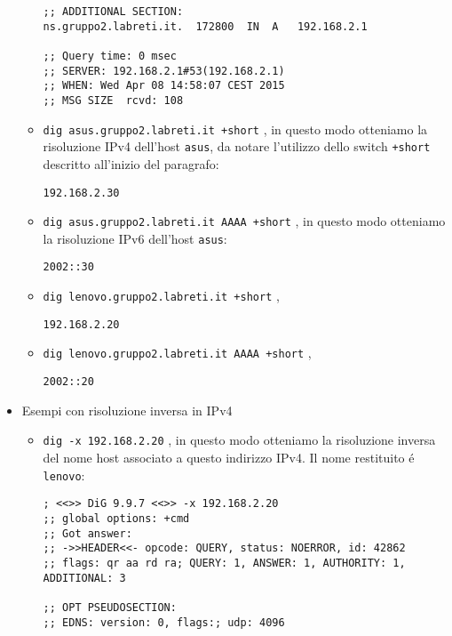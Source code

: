 \documentclass[9pt, a4paper, oneside]{article}
\begin{document}
\begin{itemize}
\begin{itemize}
\begin{verbatim}
;; ADDITIONAL SECTION:
ns.gruppo2.labreti.it.	172800	IN	A	192.168.2.1

;; Query time: 0 msec
;; SERVER: 192.168.2.1#53(192.168.2.1)
;; WHEN: Wed Apr 08 14:58:07 CEST 2015
;; MSG SIZE  rcvd: 108
								\end{verbatim}
							\item
								\texttt{dig asus.gruppo2.labreti.it +short} , 
								in questo modo 
								otteniamo la 
								risoluzione 
								IPv4 dell'host 
								\texttt{asus}, 
								da notare 
								l'utilizzo 
								dello switch 
							 	\texttt{+short} 
							 	descritto 
							 	all'inizio 
							 	del paragrafo:
								\begin{verbatim}
192.168.2.30
								\end{verbatim}
							\item
								\texttt{dig asus.gruppo2.labreti.it AAAA +short} ,
								in questo modo 
								otteniamo la 
								risoluzione 
								IPv6 dell'host 
								\texttt{asus}:
								\begin{verbatim}
2002::30		
								\end{verbatim}
							\item
								\texttt{dig lenovo.gruppo2.labreti.it +short} , 
								\begin{verbatim}
192.168.2.20
								\end{verbatim}
							\item
								\texttt{dig lenovo.gruppo2.labreti.it AAAA +short} , 
								\begin{verbatim}
2002::20
								\end{verbatim}
						\end{itemize}
					\item
						Esempi con risoluzione inversa 
						in IPv4
						\begin{itemize}
							\item
								\texttt{dig -x 192.168.2.20} , 
								in questo modo 
								otteniamo la 
								risoluzione 
								inversa del 
								nome host
								associato a 
								questo 
								indirizzo IPv4.
								Il nome 
								restituito \'e
								\texttt{lenovo}:
								\begin{verbatim}
; <<>> DiG 9.9.7 <<>> -x 192.168.2.20
;; global options: +cmd
;; Got answer:
;; ->>HEADER<<- opcode: QUERY, status: NOERROR, id: 42862
;; flags: qr aa rd ra; QUERY: 1, ANSWER: 1, AUTHORITY: 1, ADDITIONAL: 3

;; OPT PSEUDOSECTION:
;; EDNS: version: 0, flags:; udp: 4096


\end{verbatim}
\end{itemize}
\end{itemize}
\end{document}
